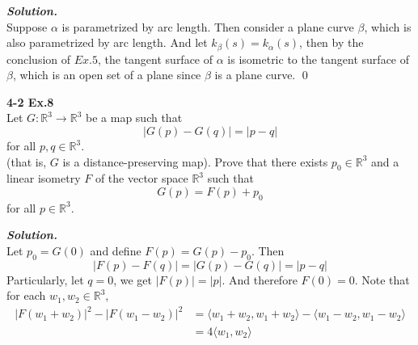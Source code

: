\documentclass{article}
\begin{document}
\par
\textbf{\textit{Solution.}}\\
Suppose $\alpha$ is parametrized by arc length.
Then consider a plane curve $\beta$, which is also parametrized by arc length.
And let $k_\beta(s) = k_\alpha(s)$, then by the conclusion of $Ex.5$, the tangent
surface of $\alpha$ is isometric to the tangent surface of $\beta$, which is an
open set of a plane since $\beta$ is a plane curve. \qed

\par
\textbf{4-2 Ex.8}\\
Let $G: \mathbb{R}^3 \to \mathbb{R}^3$ be a map such that
$$
    |G(p) - G(q)| = |p-q|
$$
for all $p,q \in \mathbb{R}^3$.\\
(that is, $G$ is a distance-preserving map). Prove that there exists 
$p_0 \in \mathbb{R}^3$ and a linear isometry $F$ of the vector space $\mathbb{R}^3$
such that
$$
    G(p) = F(p) + p_0
$$
for all $p \in \mathbb{R}^3$.

\par
\textbf{\textit{Solution.}}\\
Let $p_0 = G(0)$ and define $F(p) = G(p) - p_0$. Then
$$
    |F(p) - F(q)| = |G(p) - G(q)| = |p - q|
$$
Particularly, let $q = 0$, we get $|F(p)| = |p|$. And therefore $F(0)=0$.
Note that for each $w_1, w_2 \in \mathbb{R}^3$,
$$
\begin{aligned}
    |F(w_1 + w_2)|^2 - |F(w_1 - w_2)|^2 &= \langle w_1 + w_2, w_1 + w_2 \rangle - \langle w_1 - w_2, w_1 - w_2 \rangle\\
    &= 4\langle w_1, w_2 \rangle
\end{aligned}
$$
\end{document}
